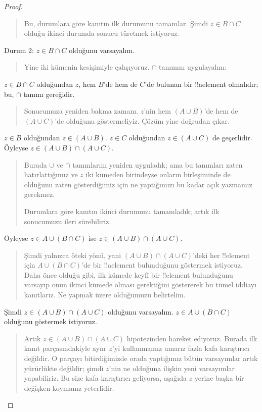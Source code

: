 \begin{proof}
\begin{quote}
Bu, durumlara göre kanıtın ilk durumunu tamamlar. Şimdi $z \in B \cap
C$ olduğu ikinci durumda sonucu türetmek istiyoruz.
\end{quote}
Durum 2: $z \in B \cap C$ olduğunu varsayalım.
\begin{quote}
Yine iki kümenin kesişimiyle çalışıyoruz. $\cap$ tanımını uygulayalım:
\end{quote}
$z \in B \cap C$ olduğundan $z$, hem $B$'de hem de $C$'de bulunan bir
!!a{element} olmalıdır; bu, $\cap$ tanımı gereğidir.
\begin{quote}
Sonucumuza yeniden bakma zamanı. $z$'nin hem $(A \cup B)$'de hem de $(A
\cup C)$'de olduğunu göstermeliyiz. Çözüm yine doğrudan çıkar.
\end{quote}
$z \in B$ olduğundan $z \in (A \cup B)$. $z \in C$ olduğundan $z \in
(A \cup C)$ de geçerlidir. Öyleyse $z \in (A \cup B) \cap (A \cup C)$.
\begin{quote}
Burada $\cup$ ve $\cap$ tanımlarını yeniden uyguladık; ama bu tanımları
zaten hatırlattığımız ve $z$ iki kümeden birindeyse onların birleşiminde
de olduğunu zaten gösterdiğimiz için ne yaptığımızı bu kadar açık
yazmamız gerekmez.

Durumlara göre kanıtın ikinci durumunu tamamladık; artık ilk sonucumuzu
ileri sürebiliriz.
\end{quote}
Öyleyse $z \in A \cup (B \cap C)$ ise $z \in (A \cup B) \cap (A \cup C)$.
\begin{quote}
Şimdi yalnızca öteki yönü, yani $(A \cup B) \cap (A \cup C)$'deki her
!!{element} için $A \cup (B \cap C)$'de bir !!a{element} bulunduğunu
göstermek istiyoruz. Daha önce olduğu gibi, ilk kümede keyfî bir
!!{element} bulunduğunu varsayıp onun ikinci kümede olması
gerektiğini göstererek bu tümel iddiayı kanıtlarız. Ne yapmak üzere
olduğumuzu belirtelim.
\end{quote}
Şimdi $z \in (A \cup B) \cap (A \cup C)$ olduğunu varsayalım. $z \in A
\cup (B \cap C)$ olduğunu göstermek istiyoruz.
\begin{quote}
Artık $z \in (A \cup B) \cap (A \cup C)$ hipotezinden hareket ediyoruz.
Burada ilk kanıt parçasındakiyle aynı~$z$'yi kullanmamız umarız fazla
kafa karıştırıcı değildir. O parçayı bitirdiğimizde orada yaptığımız
bütün varsayımlar artık yürürlükte değildir; şimdi $z$'nin ne olduğuna
ilişkin yeni varsayımlar yapabiliriz. Bu size kafa karıştırıcı
geliyorsa, aşağıda $z$ yerine başka bir değişken koymanız yeterlidir.


\end{quote}
\end{proof}
